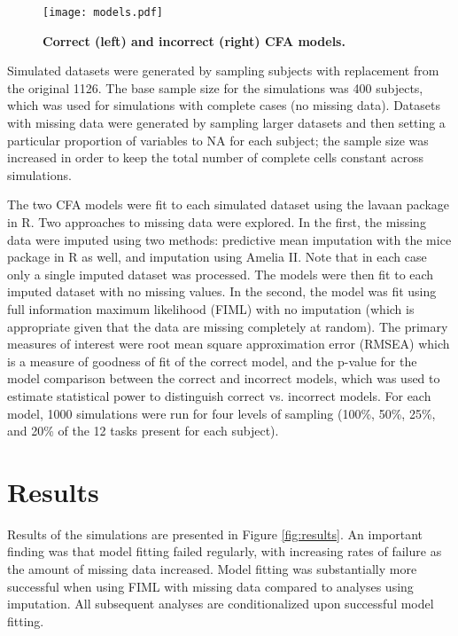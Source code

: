 \documentclass[11pt, oneside]{article}   	%
\begin{document}
\begin{figure}[!h]
\caption{\textbf{Correct (left) and incorrect (right) CFA models.}}
\centering
\texttt{[image: models.pdf]}
\label{fig:models}
\end{figure}

Simulated datasets were generated by sampling subjects with replacement from the original 1126.  The base sample size for the simulations was 400 subjects, which was used for simulations with complete cases (no missing data).  Datasets with missing data were generated by sampling larger datasets and then setting a particular proportion of variables to NA for each subject; the sample size was increased in order to keep the total number of complete cells constant across simulations.  

The two CFA models were fit to each simulated dataset using the lavaan package in R. Two approaches to missing data were explored.  In the first, the missing data were imputed using two methods: predictive mean imputation with the mice package in R as well, and imputation using Amelia II. Note that in each case only a single imputed dataset was processed.  The models were then fit to each imputed dataset with no missing values.  In the second, the model was fit using full information maximum likelihood (FIML) with no imputation (which is appropriate given that the data are missing completely at random).  The primary measures of interest were root mean square approximation error (RMSEA) which is a measure of goodness of fit of the correct model, and the p-value for the model comparison between the correct and incorrect models, which was used to estimate statistical power to distinguish correct vs. incorrect models.  For each model, 1000 simulations were run for four levels of sampling (100\%, 50\%, 25\%, and 20\% of the 12 tasks present for each subject).  

\section{Results}

Results of the simulations are presented in Figure \ref{fig:results}.  An important finding was that model fitting failed regularly, with increasing rates of failure as the amount of missing data increased.  Model fitting was substantially more successful when using FIML with missing data compared to analyses using imputation.  All subsequent analyses are conditionalized upon successful model fitting.
\end{document}
